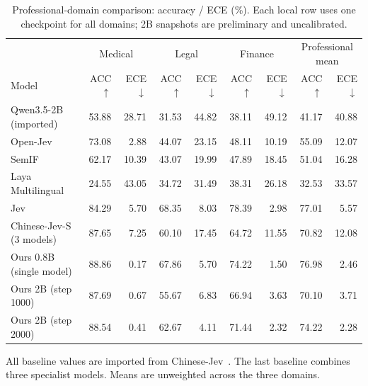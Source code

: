 \begin{table}[t]
\centering
\small
\setlength{\tabcolsep}{4pt}
\caption{Professional-domain comparison: accuracy / ECE (\%). Each local row uses one checkpoint for all domains; 2B snapshots are preliminary and uncalibrated.}
\label{tab:professional}
\begin{tabular}{lrrrrrrrr}
\toprule
& \multicolumn{2}{c}{Medical} & \multicolumn{2}{c}{Legal} & \multicolumn{2}{c}{Finance} & \multicolumn{2}{c}{Professional mean} \\ Model & ACC $\uparrow$ & ECE $\downarrow$ & ACC $\uparrow$ & ECE $\downarrow$ & ACC $\uparrow$ & ECE $\downarrow$ & ACC $\uparrow$ & ECE $\downarrow$ \\
\midrule
Qwen3.5-2B (imported) & 53.88 & 28.71 & 31.53 & 44.82 & 38.11 & 49.12 & 41.17 & 40.88 \\
Open-Jev & 73.08 & 2.88 & 44.07 & 23.15 & 48.11 & 10.19 & 55.09 & 12.07 \\
SemIF & 62.17 & 10.39 & 43.07 & 19.99 & 47.89 & 18.45 & 51.04 & 16.28 \\
Laya Multilingual & 24.55 & 43.05 & 34.72 & 31.49 & 38.31 & 26.18 & 32.53 & 33.57 \\
Jev & 84.29 & 5.70 & 68.35 & 8.03 & 78.39 & 2.98 & 77.01 & 5.57 \\
Chinese-Jev-S (3 models) & 87.65 & 7.25 & 60.10 & 17.45 & 64.72 & 11.55 & 70.82 & 12.08 \\
Ours 0.8B (single model) & 88.86 & 0.17 & 67.86 & 5.70 & 74.22 & 1.50 & 76.98 & 2.46 \\
Ours 2B (step 1000) & 87.69 & 0.67 & 55.67 & 6.83 & 66.94 & 3.63 & 70.10 & 3.71 \\
Ours 2B (step 2000) & 88.54 & 0.41 & 62.67 & 4.11 & 71.44 & 2.32 & 74.22 & 2.28 \\
\bottomrule
\end{tabular}
\par\vspace{3pt}\begin{minipage}{\textwidth}\footnotesize All baseline values are imported from Chinese-Jev~\citep{wang2026chinesejev}. The last baseline combines three specialist models. Means are unweighted across the three domains.\end{minipage}
\end{table}
